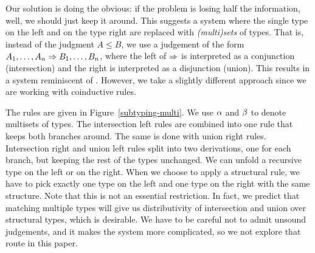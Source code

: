 \documentclass[a4paper,USenglish]{lipics-v2016}
\begin{document}
Our solution is doing the obvious: if the problem is losing half the information, well, we should just keep it around. This suggests a system where the single type on the left and on the type right are replaced with \emph{(multi)sets} of types. That is, instead of the judgment $A \le B$, we use a judgement of the form $A_1, \ldots, A_n \Rightarrow B_1, \ldots, B_n$, where the left of $\Rightarrow$ is interpreted as a conjunction (intersection) and the right is interpreted as a disjunction (union). This results in a system reminiscent of \cite{Gentzen35, Girard87}. However, we take a slightly different approach since we are working with coinductive rules.

The rules are given in Figure~\ref{subtyping-multi}. We use $\alpha$ and $\beta$ to denote multisets of types. The intersection left rules are combined into one rule that keeps both branches around. The same is done with union right rules. Intersection right and union left rules split into two derivations, one for each branch, but keeping the rest of the types unchanged. We can unfold a recursive type on the left or on the right. When we choose to apply a structural rule, we have to pick exactly one type on the left and one type on the right with the same structure. Note that this is not an essential restriction. In fact, we predict that matching multiple types will give us distributivity of intersection and union over structural types, which is desirable.  We have to be careful not to admit unsound judgements, and it makes the system more complicated, so we not explore that route in this paper.  
\end{document}
